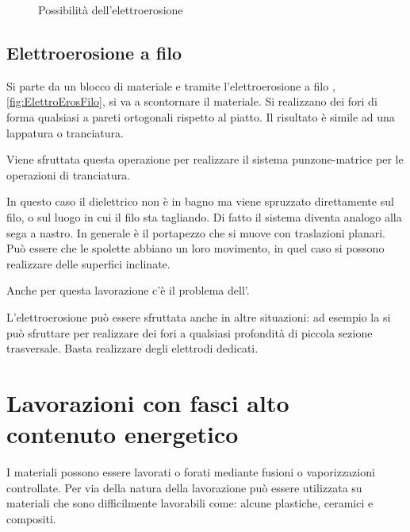 \begin{figure}
\centering
{}\quad
{}
\caption{Possibilità dell'elettroerosione}
\label{fig:ElettroEros}
\end{figure}

\subsection{Elettroerosione a filo}
Si parte da un blocco di materiale e tramite l'elettroerosione a filo , \ref{fig:ElettroErosFilo}, si va a scontornare il materiale.
Si realizzano dei fori di forma qualsiasi a pareti ortogonali rispetto al piatto. Il risultato è simile ad una lappatura o tranciatura.

Viene sfruttata questa operazione per realizzare il sistema punzone-matrice per le operazioni di tranciatura.

In questo caso il dielettrico non è in bagno ma viene spruzzato direttamente sul filo, o sul luogo in cui il filo sta tagliando.
Di fatto il sistema diventa analogo alla sega a nastro.
In generale è il portapezzo che si muove con traslazioni planari. Può essere che le spolette abbiano un loro movimento, in quel caso si possono realizzare delle superfici inclinate.

Anche per questa lavorazione c'è il problema dell'. 

L'elettroerosione può essere sfruttata anche in altre situazioni: ad esempio la si può sfruttare per realizzare dei fori a qualsiasi profondità di piccola sezione trasversale. Basta realizzare degli elettrodi dedicati.

\section{Lavorazioni con fasci alto contenuto energetico}
I materiali possono essere lavorati o forati mediante fusioni o vaporizzazioni controllate.
Per via della natura della lavorazione può essere utilizzata su materiali che sono difficilmente lavorabili come: alcune plastiche, ceramici e compositi.

